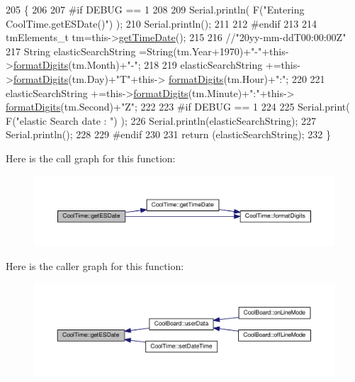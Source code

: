 \begin{DoxyCode}
205 \{
206 
207 \textcolor{preprocessor}{#if DEBUG == 1 }
208 
209     Serial.println( F(\textcolor{stringliteral}{"Entering CoolTime.getESDate()"}) );
210     Serial.println();
211 
212 \textcolor{preprocessor}{#endif }
213 
214     tmElements\_t tm=this->\hyperlink{class_cool_time_a7a7501c5ca77dd1248bea704c44f986c}{getTimeDate}();
215 
216     \textcolor{comment}{//"20yy-mm-ddT00:00:00Z"}
217     String elasticSearchString =String(tm.Year+1970)+\textcolor{stringliteral}{"-"}+this->\hyperlink{class_cool_time_acd537cd4210d7bde4e1f5c47d2ac0456}{formatDigits}(tm.Month)+\textcolor{stringliteral}{"-"};
218 
219     elasticSearchString +=this->\hyperlink{class_cool_time_acd537cd4210d7bde4e1f5c47d2ac0456}{formatDigits}(tm.Day)+\textcolor{stringliteral}{"T"}+this->
      \hyperlink{class_cool_time_acd537cd4210d7bde4e1f5c47d2ac0456}{formatDigits}(tm.Hour)+\textcolor{stringliteral}{":"};
220     
221     elasticSearchString +=this->\hyperlink{class_cool_time_acd537cd4210d7bde4e1f5c47d2ac0456}{formatDigits}(tm.Minute)+\textcolor{stringliteral}{":"}+this->
      \hyperlink{class_cool_time_acd537cd4210d7bde4e1f5c47d2ac0456}{formatDigits}(tm.Second)+\textcolor{stringliteral}{"Z"};
222 
223 \textcolor{preprocessor}{#if DEBUG == 1 }
224 
225     Serial.print( F(\textcolor{stringliteral}{"elastic Search date : "}) );
226     Serial.println(elasticSearchString);
227     Serial.println();
228 
229 \textcolor{preprocessor}{#endif}
230 
231     \textcolor{keywordflow}{return} (elasticSearchString);
232 \}
\end{DoxyCode}
Here is the call graph for this function\+:\nopagebreak
\begin{figure}[H]
\begin{center}
\leavevmode
\includegraphics[width=350pt]{d6/d49/class_cool_time_ac4f32ee513c1328d984306645e8785a4_cgraph}
\end{center}
\end{figure}
Here is the caller graph for this function\+:\nopagebreak
\begin{figure}[H]
\begin{center}
\leavevmode
\includegraphics[width=350pt]{d6/d49/class_cool_time_ac4f32ee513c1328d984306645e8785a4_icgraph}
\end{center}
\end{figure}
